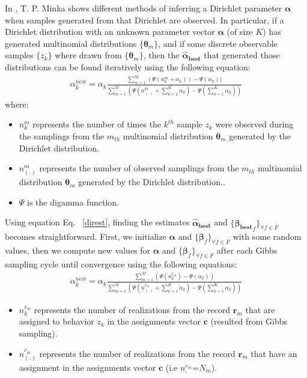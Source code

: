 In \cite{diring}, T. P. Minka shows different methods of inferring a Dirichlet parameter $\boldsymbol{\alpha}$ when samples generated from that Dirichlet are observed. In particular, if a Dirichlet distribution with an unknown parameter vector $\boldsymbol{\alpha}$ (of size $K$) has generated multinomial distributions $\{\boldsymbol{\theta}_{m}\}$, and if some discrete observable samples $\{z_{k}\}$ where drawn from $\{\boldsymbol{\theta}_{m}\}$, then the $\boldsymbol{\widehat{\alpha}_{best}}$ that generated those distributions can be found iteratively using the following equation:
\begin{equation}\label{direst}
\begin{split} 
\alpha_{k}^{new}= \alpha_{k} \frac{\sum_{m=1}^{M}(\Psi (n^{m}_{k}+\alpha_{k}))-\Psi (\alpha_{k}))}{\sum_{m=1}^{M}(\Psi (n^{m}_{(.)}+\sum_{k=1}^{K}\alpha _{k})-\Psi (\sum_{k=1}^{K}\alpha _{k}))}
\end{split} 
\end{equation}
where:
\begin{itemize} 
	\item $n^{m}_{k}$ represents the number of times the $k^{th}$ sample $z_{k}$ were observed during the samplings from the $m_{th}$ multinomial distribution   $\boldsymbol{\theta}_{m}$ generated by the Dirichlet distribution.
	\item $n^{m}_{(.)}$ represents the number of observed samplings from the $m_{th}$ multinomial distribution   $\boldsymbol{\theta}_{m}$ generated by the Dirichlet distribution..
	\item  $\Psi$ is the digamma function.
\end{itemize}

Using equation Eq. ~\eqref{direst}, finding the estimates $\boldsymbol{\widehat{\alpha}_{best}}$ and $\{\boldsymbol{\widehat{\beta }_{best}}_{f}\}_{\forall f\in F}$ becomes straightforward. First, we initialize  $\boldsymbol{\alpha}$ and $\{\boldsymbol{\beta }_{f}\}_{\forall f\in F}$ with some random values, then we compute new values for $\boldsymbol{\alpha}$ and $\{\boldsymbol{\beta }_{f}\}_{\forall f\in F}$ after each Gibbs sampling cycle until convergence using the following equations:
\begin{equation}\label{alphaest}
\begin{split} 
\alpha_{k}^{new}= \alpha_{k} \frac{\sum_{m=1}^{M}(\Psi (n^{r_{m}}_{k})-\Psi (\alpha_{k}))}{\sum_{m=1}^{M}(\Psi (n^{r_{m}}_{(.)}+\sum_{k=1}^{K}\alpha _{k})-\Psi (\sum_{k=1}^{K}\alpha _{k}))}
\end{split} 
\end{equation}
\begin{itemize} 
	\item  $n^{r_{m}}_{k}$ represents the number of realizations from the record $\mathbf{r}_{m}$ that are assigned to behavior $z_{k}$ in the assignments vector $\mathbf{c}$ (resulted from Gibbs sampling).
	\item  $n^{r_{m}}_{(.)}$ represents the number of realizations from the record $\mathbf{r}_{m}$ that have an assignment in the assignments vector $\mathbf{c}$ (i.e $n^{r_{m}}_{.}$=$N_{m}$).
\end{itemize}

